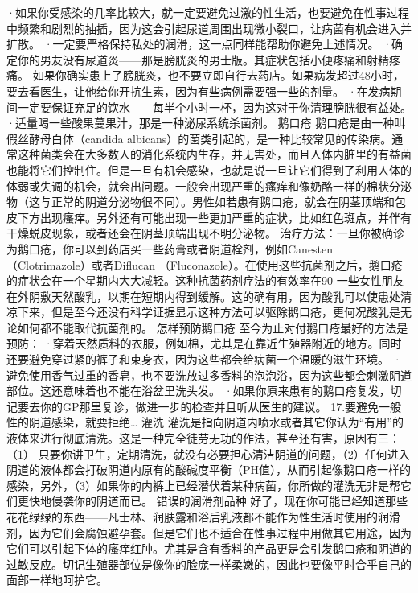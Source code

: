 \documentclass[12pt,UTF8,openany]{ctexbook}
\begin{document}
·如果你受感染的几率比较大，就一定要避免过激的性生活，也要避免在性事过程中频繁和剧烈的抽插，因为这会引起尿道周围出现微小裂口，让病菌有机会进入并扩散。
·一定要严格保持私处的润滑，这一点同样能帮助你避免上述情况。
·确定你的男友没有尿道炎——那是膀胱炎的男士版。其症状包括小便疼痛和射精疼痛。
如果你确实患上了膀胱炎，也不要立即自行去药店。如果病发超过48小时，要去看医生，让他给你开抗生素，因为有些病例需要强一些的剂量。
·在发病期间一定要保证充足的饮水——每半个小时一杯，因为这对于你清理膀胱很有益处。
·适量喝一些酸果蔓果汁，那是一种泌尿系统杀菌剂。
鹅口疮
鹅口疮是由一种叫假丝酵母白体（candida albicans）的菌类引起的，是一种比较常见的传染病。通常这种菌类会在大多数人的消化系统内生存，并无害处，而且人体内脏里的有益菌也能将它们控制住。但是一旦有机会感染，也就是说一旦让它们得到了利用人体的体弱或失调的机会，就会出问题。一般会出现严重的瘙痒和像奶酪一样的棉状分泌物（这与正常的阴道分泌物很不同）。男性如若患有鹅口疮，就会在阴茎顶端和包皮下方出现瘙痒。另外还有可能出现一些更加严重的症状，比如红色斑点，并伴有干燥蜕皮现象，或者还会在阴茎顶端出现不明分泌物。
治疗方法：一旦你被确诊为鹅口疮，你可以到药店买一些药膏或者阴道栓剂，例如Canesten（Clotrimazole）或者Diflucan （Fluconazole）。在使用这些抗菌剂之后，鹅口疮的症状会在一个星期内大大减轻。这种抗菌药剂疗法的有效率在90%
一些女性朋友在外阴敷天然酸乳，以期在短期内得到缓解。这的确有用，因为酸乳可以使患处清凉下来，但是至今还没有科学证据显示这种方法可以驱除鹅口疮，更何况酸乳是无论如何都不能取代抗菌剂的。
怎样预防鹅口疮
至今为止对付鹅口疮最好的方法是预防：
·穿着天然质料的衣服，例如棉，尤其是在靠近生殖器附近的地方。同时还要避免穿过紧的裤子和束身衣，因为这些都会给病菌一个温暖的滋生环境。
·避免使用香气过重的香皂，也不要洗放过多香料的泡泡浴，因为这些都会刺激阴道部位。这还意味着也不能在浴盆里洗头发。
·如果你原来患有的鹅口疮复发，切记要去你的GP那里复诊，做进一步的检查并且听从医生的建议。
17.要避免一般性的阴道感染，就要拒绝…
灌洗
灌洗是指向阴道内喷水或者其它你认为“有用”的液体来进行彻底清洗。这是一种完全徒劳无功的作法，甚至还有害，原因有三：
（1） 只要你讲卫生，定期清洗，就没有必要担心清洁阴道的问题，（2）任何进入阴道的液体都会打破阴道内原有的酸碱度平衡（PH值），从而引起像鹅口疮一样的感染，另外，（3）如果你的内裤上已经潜伏着某种病菌，你所做的灌洗无非是帮它们更快地侵袭你的阴道而已。
错误的润滑剂品种
好了，现在你可能已经知道那些花花绿绿的东西——凡士林、润肤露和浴后乳液都不能作为性生活时使用的润滑剂，因为它们会腐蚀避孕套。但是它们也不适合在性事过程中用做其它用途，因为它们可以引起下体的瘙痒红肿。尤其是含有香料的产品更是会引发鹅口疮和阴道的过敏反应。切记生殖器部位是像你的脸庞一样柔嫩的，因此也要像平时合乎自己的面部一样地呵护它。
\end{document}
